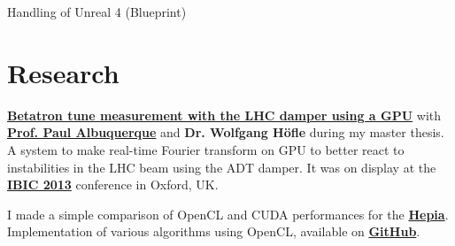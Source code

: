 \documentclass[a4paper]{deedy-resume} %
\begin{document}
\begin{minipage}[t]{0.66\textwidth}

	\begin{tightitemize}
		\item Handling of Unreal 4 (Blueprint)
	\end{tightitemize}

\sectionspace



\section{Research}

	\textbf{\href{http://cds.cern.ch/record/1545785?ln=en}
		{Betatron tune measurement with the LHC damper using a GPU}}
	with
	\textbf{\href{http://ch.linkedin.com/pub/paul-albuquerque/12/366/809}
		{Prof. Paul Albuquerque}}
	and \textbf{Dr. Wolfgang Höf\/le} during my master thesis.
	A system to make real-time Fourier transform on GPU to better react to instabilities in the LHC 
	beam using the ADT damper. It was on display at the 
	\textbf{\href{http://www.ibic2013.org}{IBIC 2013}} conference in Oxford, UK.

\sectionspace %


	I made a simple comparison of OpenCL and CUDA performances for the 
	\textbf{\href{https://www.hesge.ch/hepia/}{Hepia}}. Implementation of various 
	algorithms using OpenCL, available on
	\textbf{\href{https://github.com/anirul/OpenCL\_PA\_2012}{GitHub}}.

\sectionspace

\end{minipage}%
\hfill%
%
%
\end{document}
